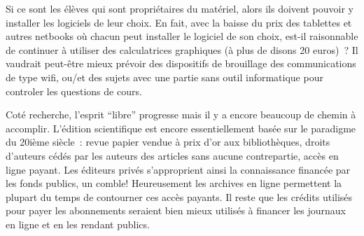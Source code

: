 \documentclass[a4paper,11pt]{article}
\begin{document}
\begin{giacjshere}
Si ce sont les \'el\`eves qui sont propri\'etaires du mat\'eriel, alors
ils doivent pouvoir y installer les logiciels de leur choix.
En fait, avec la baisse du prix des tablettes et autres
netbooks o\`u chacun peut installer le logiciel de son
choix, est-il raisonnable de continuer \`a utiliser
des calculatrices graphiques (\`a plus de disons 20 euros)~? Il vaudrait
peut-\^etre mieux pr\'evoir des dispositifs de brouillage
des communications de type wifi, ou/et des sujets avec
une partie sans outil informatique pour controler les questions
de cours.

Cot\'e recherche, l'esprit ``libre'' progresse mais il y a encore
beaucoup de chemin \`a accomplir. L'\'edition scientifique
est encore essentiellement bas\'ee sur le paradigme du 20i\`eme
si\`ecle~: revue papier vendue \`a prix d'or aux biblioth\`eques,
droits d'auteurs c\'ed\'es par les auteurs des articles sans aucune
contrepartie, acc\`es en ligne payant. Les \'editeurs priv\'es
s'approprient ainsi la connaissance financ\'ee par les fonds publics,
un comble!
Heureusement les archives en ligne permettent la plupart
du temps de contourner ces acc\`es payants. Il reste
que les cr\'edits utilis\'es pour payer les abonnements seraient
bien mieux utilis\'es \`a financer les journaux en ligne et en
les rendant publics.


\end{giacjshere}
\end{document}
